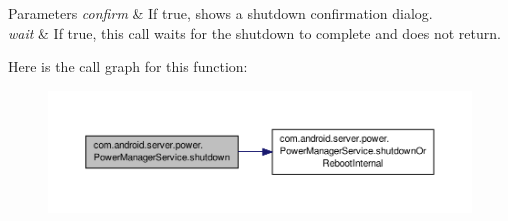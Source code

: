 \begin{DoxyParams}{Parameters}
{\em confirm} & If true, shows a shutdown confirmation dialog. \\
\hline
{\em wait} & If true, this call waits for the shutdown to complete and does not return. \\
\hline
\end{DoxyParams}


Here is the call graph for this function\-:
\nopagebreak
\begin{figure}[H]
\begin{center}
\leavevmode
\includegraphics[width=350pt]{classcom_1_1android_1_1server_1_1power_1_1PowerManagerService_a1ae14154de05bc246283fa01687e4fc8_cgraph}
\end{center}
\end{figure}


